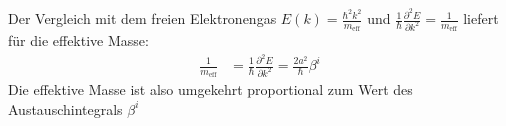 Der Vergleich mit dem freien Elektronengas $E(k) = \frac{\hbar^2 k^2}{m_{\mathrm{eff}}}$ und $\frac{1}{\hbar}\frac{\partial^2 E}{\partial k^2} = \frac{1}{m_{\mathrm{eff}}}$ liefert für die effektive Masse:
\begin{align*}
\frac{1}{m_{\mathrm{eff}}} &= \frac{1}{\hbar}\frac{\partial^2 E}{\partial k^2}
 = \frac{2 a^2}{\hbar} \beta^i
\end{align*}
Die effektive Masse ist also umgekehrt proportional zum Wert des Austauschintegrals $\beta^i$
